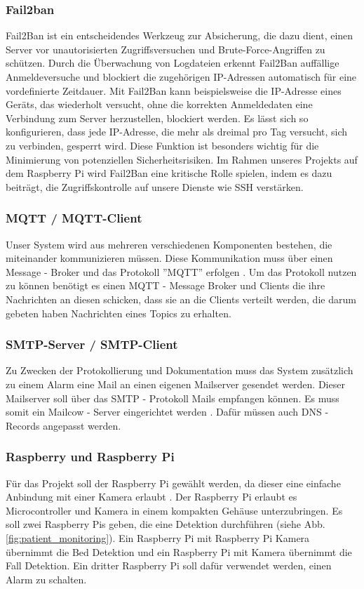 \subsubsection{Fail2ban}
Fail2Ban ist ein entscheidendes Werkzeug zur Absicherung, die dazu dient, einen Server vor unautorisierten Zugriffsversuchen und Brute-Force-Angriffen zu schützen. Durch die Überwachung von Logdateien erkennt Fail2Ban auffällige Anmeldeversuche und blockiert die zugehörigen IP-Adressen automatisch für eine vordefinierte Zeitdauer. Mit Fail2Ban kann beispielsweise die IP-Adresse eines Geräts, das wiederholt versucht, ohne die korrekten Anmeldedaten eine Verbindung zum Server herzustellen, blockiert werden. Es lässt sich so konfigurieren, dass jede IP-Adresse, die mehr als dreimal pro Tag versucht, sich zu verbinden, gesperrt wird. \cite{Fail2ban} Diese Funktion ist besonders wichtig für die Minimierung von potenziellen Sicherheitsrisiken. Im Rahmen unseres Projekts auf dem Raspberry Pi wird Fail2Ban eine kritische Rolle spielen, indem es dazu beiträgt, die Zugriffskontrolle auf unsere Dienste wie SSH verstärken.

\subsubsection{MQTT / MQTT-Client}
Unser System wird aus mehreren verschiedenen Komponenten bestehen, die miteinander kommunizieren müssen. Diese Kommunikation muss über einen Message - Broker und das Protokoll ''MQTT'' erfolgen \cite{MQTT} . Um das Protokoll nutzen zu können benötigt es einen MQTT - Message Broker und Clients die ihre Nachrichten an diesen schicken, dass sie an die Clients verteilt werden, die darum gebeten haben Nachrichten eines Topics zu erhalten. 

\subsubsection{SMTP-Server / SMTP-Client}
Zu Zwecken der Protokollierung und Dokumentation muss das System zusätzlich zu einem Alarm eine Mail an einen eigenen Mailserver gesendet werden. Dieser Mailserver soll über das SMTP - Protokoll Mails empfangen können. Es muss somit ein Mailcow - Server eingerichtet werden  \cite{Mailcow} . Dafür müssen auch DNS - Records angepasst werden. 

\subsubsection{Raspberry und Raspberry Pi} \label{sec:raspi}
Für das Projekt soll der Raspberry Pi gewählt werden, da dieser eine einfache Anbindung mit einer Kamera erlaubt \cite{Raspberry}  \cite{Raspberry_camera}. Der Raspberry Pi erlaubt es Microcontroller und Kamera in einem kompakten Gehäuse unterzubringen.  Es soll zwei Raspberry Pis geben, die eine Detektion  durchführen (siehe Abb. \ref{fig:patient_monitoring}). Ein Raspberry Pi mit Raspberry Pi Kamera übernimmt die Bed Detektion und ein Raspberry Pi mit Kamera übernimmt die Fall Detektion. Ein dritter Raspberry Pi soll  dafür verwendet werden,  einen Alarm zu schalten. 

